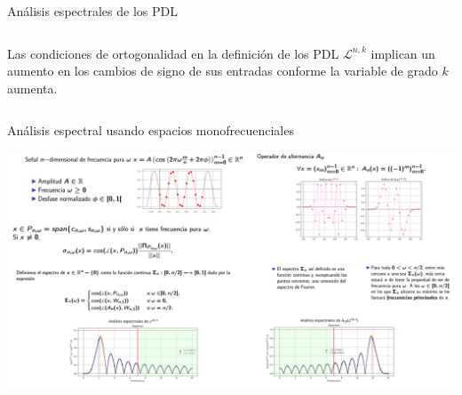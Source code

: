 \documentclass[final,hyperref={pdfpagelabels=false}]{beamer}
\newcommand{\cali}[1]{\mathcal{#1}} %
\begin{document}
\begin{frame}
\begin{columns}
\begin{column}{.49\textwidth}
\begin{block}{An\'alisis espectrales de los PDL}
\begin{columns}
\begin{column}{.59\textwidth}
              	Las condiciones de ortogonalidad en la definici\'on de los
              	PDL $\cali{L}^{n,k}$ 
              	implican un aumento en los cambios de signo de sus entradas
              	conforme la variable de grado $k$ aumenta.
                \end{column}
              \end{columns}
            \end{block}
            \vfill
            \vspace{1cm}
            
            \begin{block}{An\'alisis espectral usando espacios monofrecuenciales}
            
            \begin{center}
            \includegraphics[width=1\linewidth]{espectro_espMono_bien}
            \end{center}
				

\end{block}
\end{column}
\end{columns}
\end{frame}
\end{document}
